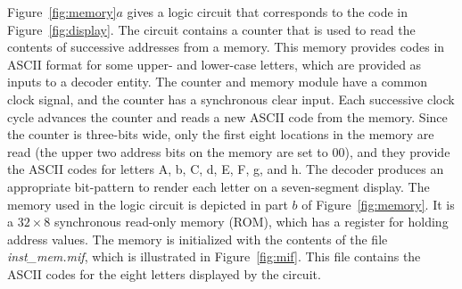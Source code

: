 \documentclass[11pt, twoside, pdftex]{article}
\begin{document}
\noindent
Figure~\ref{fig:memory}$a$ gives a logic circuit that corresponds to the code in 
Figure~\ref{fig:display}. The circuit contains a counter that is used to read the 
contents of successive addresses from a memory. This memory provides codes in ASCII format 
for some upper- and lower-case letters, which are provided as inputs to a decoder entity. 
The counter and memory module have a common clock signal, and the counter has a
synchronous clear input. Each successive clock cycle advances the counter and reads 
a new ASCII code from the memory. Since the counter is three-bits wide, only the first 
eight locations in the memory are read (the upper two address bits on the memory are set
to 00), and they provide the ASCII codes for letters A, b, C, d, E, F, g, and h. The 
decoder produces an appropriate bit-pattern to render each letter on a seven-segment display.
The memory used in the logic circuit is depicted in part $b$ of Figure~\ref{fig:memory}. It
is a $32 \times 8$ synchronous read-only memory (ROM), which has a register for holding 
address values. The memory is initialized with the contents of the file {\it inst\_mem.mif},
which is illustrated in Figure~\ref{fig:mif}. This file contains the ASCII codes for the 
eight letters displayed by the circuit.
\end{document}
